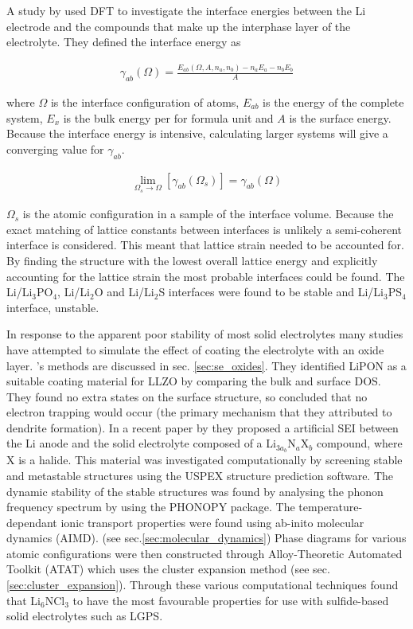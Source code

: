 \documentclass[../main.tex]{subfiles}
\begin{document}
A study by \citeauthor{Lepley2015} used DFT to investigate the interface energies between the Li electrode and the compounds that make up the interphase layer of the electrolyte.\cite{Lepley2015} They defined the interface energy as 

\begin{gather}
    \gamma_{ab}(\Omega)=\frac{E_{ab}(\Omega,A,n_a,n_b)-n_aE_a-n_bE_b}{A}
\end{gather}

where $\Omega$ is the interface configuration of atoms, $E_{ab}$ is the energy of the complete system, $E_x$ is the bulk energy per for formula unit and $A$ is the surface energy. Because the interface energy is intensive, calculating larger systems will give a converging value for $\gamma_{ab}$.

\begin{gather}
    \lim_{\Omega_s \rightarrow \Omega} \left[\gamma_{ab}(\Omega_s)\right]=\gamma_{ab}(\Omega)
\end{gather}

$\Omega_s$ is the atomic configuration in a sample of the interface volume. Because the exact matching of lattice constants between interfaces is unlikely a semi-coherent interface is considered. This meant that lattice strain needed to be accounted for. By finding the structure with the lowest overall lattice energy and explicitly accounting for the lattice strain the most probable interfaces could be found. The Li/Li$_3$PO$_4$, Li/Li$_2$O and Li/Li$_2$S interfaces were found to be stable and Li/Li$_3$PS$_4$ interface, unstable.

In response to the apparent poor stability of most solid electrolytes many studies have attempted to simulate the effect of coating the electrolyte with an oxide layer\cite{Zhang2020directvis, Xiao2019coat, Tian2018}. \citeauthor{Tian2018}'s methods are discussed in sec. \ref{sec:se_oxides}. They identified LiPON as a suitable coating material for LLZO by comparing the bulk and surface DOS\cite{Tian2018}. They found no extra states on the surface structure, so concluded that no electron trapping would occur (the primary mechanism that they attributed to dendrite formation). In a recent paper by \citeauthor{Sang2020} they proposed a artificial SEI between the Li anode and the solid electrolyte composed of a Li$_{3a_b}$N$_a$X$_b$ compound, where X is a halide.\cite{Sang2020} 
This material was investigated computationally by screening stable and metastable structures using the USPEX structure prediction software.\cite{Glass2006, Oganov2006} The dynamic stability of the stable structures was found by analysing the phonon frequency spectrum by using the PHONOPY package.\cite{Parlinski1997, Togo2008} The temperature-dependant ionic transport properties were found using ab-inito molecular dynamics (AIMD). 
(see sec.\ref{sec:molecular_dynamics}) 
Phase diagrams for various atomic configurations were then constructed through Alloy-Theoretic Automated Toolkit (ATAT) which uses the cluster expansion method (see sec. \ref{sec:cluster_expansion}).\cite{Hart2008, VandeWalle2002} Through these various computational techniques \citeauthor{Sang2020} found that Li$_6$NCl$_3$ to have the most favourable properties for use with sulfide-based solid electrolytes such as LGPS. 
\end{document}
